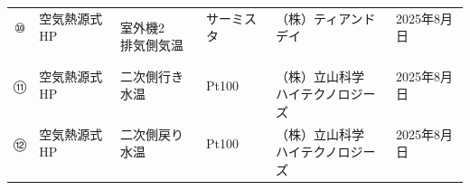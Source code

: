 \documentclass[
  japanese,
  11pt,
  letterpaper,
  DIV=11,
  numbers=noendperiod]{scrartcl}
\begin{document}
\begin{table}[H]
{\begin{tabular*}{\linewidth}{@{\extracolsep{\fill}}clllll}
\shortstack[l]{⑩ \\　} & \shortstack[l]{空気熱源式HP \\　} & \shortstack[l]{室外機2 \\排気側気温} & \shortstack[l]{サーミスタ \\　} & \shortstack[l]{（株）ティアンドデイ \\　} & \shortstack[l]{2025年8月日 \\　} \\ 
\shortstack[l]{⑪ \\　} & \shortstack[l]{空気熱源式HP \\　} & \shortstack[l]{二次側行き水温 \\　} & \shortstack[l]{Pt100 \\　} & \shortstack[l]{（株）立山科学 \\ハイテクノロジーズ} & \shortstack[l]{2025年8月日 \\　} \\ 
\shortstack[l]{⑫ \\　} & \shortstack[l]{空気熱源式HP \\　} & \shortstack[l]{二次側戻り水温 \\　} & \shortstack[l]{Pt100 \\　} & \shortstack[l]{（株）立山科学 \\ハイテクノロジーズ} & \shortstack[l]{2025年8月日 \\　} \\ 
\bottomrule
\end{tabular*}

}

\end{table}%
\end{document}
